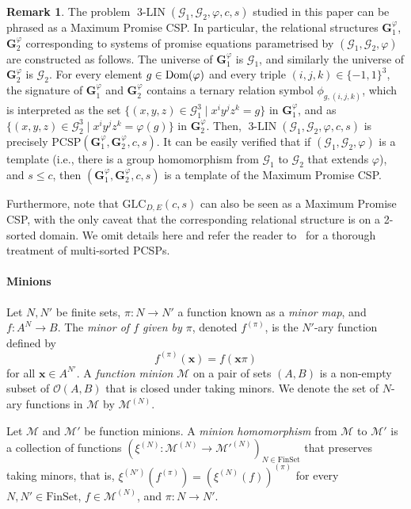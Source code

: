 \documentclass[a4paper,11pt]{article}
\theoremstyle{definition}
\newtheorem{remark}[theorem]{Remark}
\newcommand{\mnn}[1]{\mathscr{#1}}
\newcommand{\gr}{\mathscr{G}}
\newcommand{\bx}{\mathbf{x}}
\newcommand{\glc}{\mathrm{GLC}}
\newcommand{\pcsp}{\mathrm{PCSP}}
\newcommand{\dom}{\textnormal{Dom}}
\newcommand{\eq}{\ensuremath{\operatorname{3-LIN}}}
\newcommand{\FinSet}{\mathrm{FinSet}}
\begin{document}
\begin{remark}\label{re:pcsp-groups} 
The problem $\eq(\gr_1,\gr_2,\varphi,c,s)$ studied in this paper can be phrased as a Maximum Promise CSP. In particular, the relational structures $\mathbf{G}_1^\varphi$, $\mathbf{G}_2^\varphi$ corresponding to
systems of promise equations parametrised by  $(\gr_1, \gr_2, \varphi)$ are constructed as follows.
The universe of $\mathbf{G}_1^\varphi$ is $\gr_1$, and similarly the universe of
$\mathbf{G}_2^\varphi$ is $\gr_2$. For every element $g\in \dom(\varphi)$ and every
triple $(i,j,k) \in \{-1,1\}^3$, the signature of $\mathbf{G}_1^\varphi$ and
$\mathbf{G}_2^\varphi$ contains a ternary relation symbol $\phi_{g,(i,j,k)}$,
which is interpreted as the set $\{ (x,y,z) \in \gr^3_1 \mid x^i y^j z^k = g\}$
in  $\mathbf{G}_1^\varphi$, and as $\{(x,y,z) \in \gr_2^3 \mid x^i y^j z^k  =
\varphi(g) \}$ in  $\mathbf{G}_2^\varphi$.
Then, $\eq(\gr_1,\gr_2,\varphi,c,s)$ is precisely $\pcsp(\mathbf{G}_1^\varphi,\mathbf{G}_2^\varphi,c,s)$. 
It can be easily verified that if $(\gr_1,\gr_2,\varphi)$ is a template (i.e., there is a group homomorphism from $\gr_1$ to $\gr_2$ that extends $\varphi$), and $s \leq c$, then $(\mathbf{G}_1^\varphi,\mathbf{G}_2^\varphi,c,s)$ is a template of the Maximum Promise CSP.

Furthermore, note that $\glc_{D,E}(c,s)$ can also be seen as a Maximum Promise CSP, with the only caveat that the corresponding relational structure is on a 2-sorted domain. We omit details here and refer the reader to~\cite{Barto24:lics} for a thorough treatment of multi-sorted PCSPs.
\end{remark}

\paragraph{Minions}

Let $N,N'$ be finite sets, $\pi:N\to N'$ a function known as a \emph{minor map}, and $f : A^{N}\to B$. The \emph{minor of $f$ given by $\pi$}, denoted $f^{(\pi)}$, is the $N'$-ary function defined by
\[f^{(\pi)}(\bx) = f(\bx \pi)\]
for all $\bx \in A^{N'}$.
A \emph{function minion} $\mnn M$ on a pair of sets $(A,B)$ is a non-empty subset of $\mathscr{O}(A,B)$ that is closed under
taking minors. We denote the set of $N$-ary functions in $\mnn{M}$ by $\mnn{M}^{(N)}$.


 Let $\mnn M $ and $\mnn M'$ be function minions. A \emph{minion homomorphism} from $\mnn M $ to  $\mnn M'$ is a collection of functions $(\xi^{(N)}: \mnn M^{(N)} \to \mnn M'^{(N)})_{N \in \FinSet}$ that preserves taking minors, that is, $\xi^{(N')}(f^{(\pi)})=(\xi^{(N)}(f))^{(\pi)}$ for every $N, N' \in \FinSet$, $f \in \mnn{M}^{(N)}$, and $\pi:N \to N'$.
\end{document}
